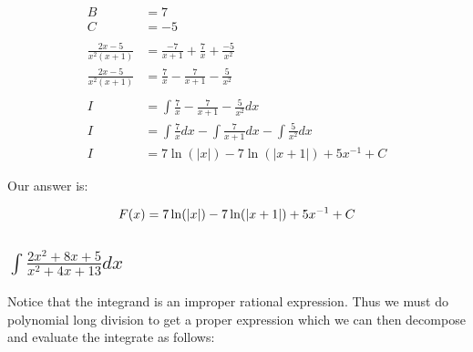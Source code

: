 \documentclass[12pt]{article}
\begin{document}
\begin{align}
    \nonumber                                                                                     \\
    B                     & = 7                                                                   \\
    C                     & = -5                                                                  \\
    \nonumber                                                                                     \\
    \frac{2x-5}{x^2(x+1)} & = \frac{-7}{x+1} + \frac{7}{x} + \frac{-5}{x^2}                       \\
    \frac{2x-5}{x^2(x+1)} & = \frac{7}{x} - \frac{7}{x+1} - \frac{5}{x^2}                         \\
    \nonumber                                                                                     \\
    I                     & = \int \frac{7}{x} - \frac{7}{x+1} - \frac{5}{x^2} dx                 \\
    I                     & = \int \frac{7}{x} dx - \int \frac{7}{x+1} dx - \int \frac{5}{x^2} dx \\
    I                     & = 7\ln(|x|) - 7\ln(|x+1|) + 5x^{-1} + C
\end{align}

Our answer is:

$$
    F(x) = 7\ln(|x|) - 7\ln(|x+1|) + 5x^{-1} + C \\
$$

\subsection{$\int \frac{2x^2+8x+5}{x^2+4x+13} dx$}

Notice that the integrand is an improper rational expression.
Thus we must do polynomial long division to get a proper expression which we can then decompose and evaluate the integrate as follows:
\end{document}
